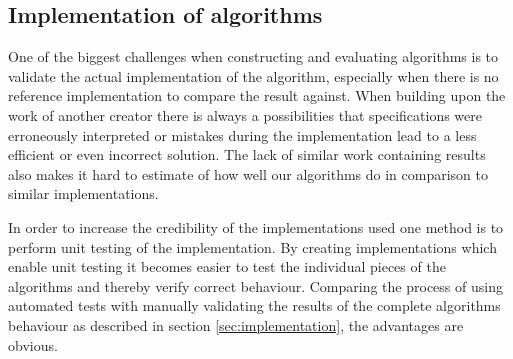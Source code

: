 \subsection{Implementation of algorithms}

One of the biggest challenges when constructing and evaluating algorithms is to
validate the actual implementation of the algorithm, especially when there is
no reference implementation to compare the result against. When building upon
the work of another creator there is always a possibilities that specifications
were erroneously interpreted or mistakes during the implementation lead to a less
efficient or even incorrect solution. The lack of similar work containing results
also makes it hard to estimate of how well our algorithms do in
comparison to similar implementations.

In order to increase the credibility of the implementations used one method is
to perform unit testing of the implementation. By creating implementations
which enable unit testing it becomes easier to test the individual pieces of
the algorithms and thereby verify correct behaviour. Comparing the process of
using automated tests with manually validating the results of the complete
algorithms behaviour as described in section \ref{sec:implementation}, the
advantages are obvious.
